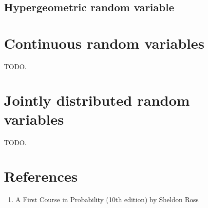 \documentclass{article}
\begin{document}
\subsection{Hypergeometric random variable}


\section{Continuous random variables}

TODO.

\section{Jointly distributed random variables}

TODO.

\section{References}

\begin{enumerate}
  \item A First Course in Probability (10th edition) by Sheldon Ross
\end{enumerate}
\end{document}

